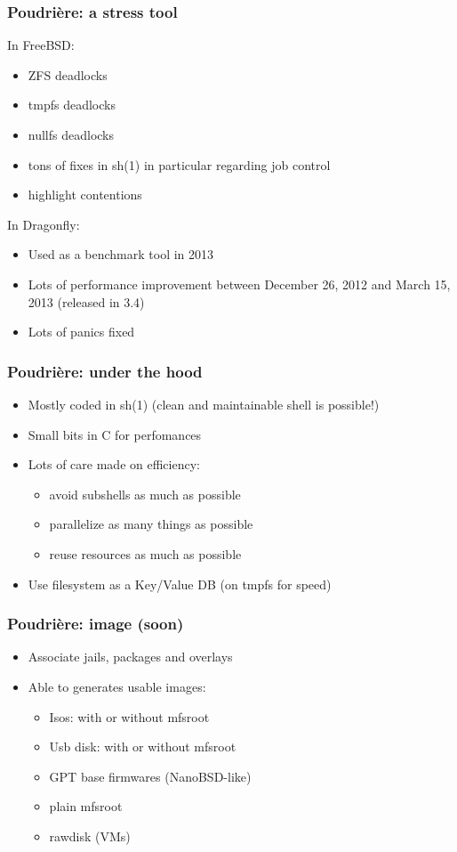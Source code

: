 \begin{frame}
	\frametitle{Poudrière: a stress tool}
	In FreeBSD:
	\begin{itemize}
		\item ZFS deadlocks
		\item tmpfs deadlocks
		\item nullfs deadlocks
		\item tons of fixes in sh(1) in particular regarding job control
		\item highlight contentions
	\end{itemize}
	In Dragonfly:
	\begin{itemize}
		\item Used as a benchmark tool in 2013
		\item Lots of performance improvement between December 26, 2012 and March 15, 2013 (released in 3.4)
		\item Lots of panics fixed
	\end{itemize}
\end{frame}

\begin{frame}
	\frametitle{Poudrière: under the hood}
	\begin{itemize}
			\pause
		\item Mostly coded in sh(1) (clean and maintainable shell is possible!)
			\pause
		\item Small bits in C for perfomances
			\pause
		\item Lots of care made on efficiency:
			\begin{itemize}
				\item avoid subshells as much as possible
				\item parallelize as many things as possible
				\item reuse resources as much as possible
			\end{itemize}
		\item Use filesystem as a Key/Value DB (on tmpfs for speed)
	\end{itemize}
\end{frame}

\begin{frame}
	\frametitle{Poudrière: image (soon)}
	\begin{itemize}
		\item Associate jails, packages and overlays
		\item Able to generates usable images:
			\begin{itemize}
				\item Isos: with or without mfsroot
				\item Usb disk: with or without mfsroot
				\item GPT base firmwares (NanoBSD-like)
				\item plain mfsroot
				\item rawdisk (VMs)
			\end{itemize}
	\end{itemize}
\end{frame}

